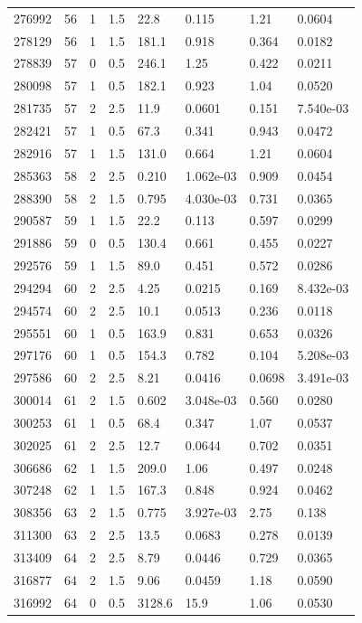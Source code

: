 \documentclass[preview]{standalone}
\begin{document}
{{{{{\begin{tabular}{L{1.2cm}C{1.2cm} C{0.3cm}C{0.5cm} C{1.4cm}C{1.4cm} C{1.4cm}C{1.4cm}}
  276992  &    56  & 1     & 1.5 &  22.8  & 0.115  & 1.21 &  0.0604   \\ 
  278129  &    56  & 1     & 1.5 &  181.1  & 0.918  & 0.364 &  0.0182   \\ 
  278839  &    57  & 0     & 0.5 &  246.1  & 1.25  & 0.422 &  0.0211   \\ 
  280098  &    57  & 1     & 0.5 &  182.1  & 0.923  & 1.04 &  0.0520   \\ 
  281735  &    57  & 2     & 2.5 &  11.9  & 0.0601  & 0.151 &  7.540e-03   \\ 
  282421  &    57  & 1     & 0.5 &  67.3  & 0.341  & 0.943 &  0.0472   \\ 
  282916  &    57  & 1     & 1.5 &  131.0  & 0.664  & 1.21 &  0.0604   \\ 
  285363  &    58  & 2     & 2.5 &  0.210  & 1.062e-03  & 0.909 &  0.0454   \\ 
  288390  &    58  & 2     & 1.5 &  0.795  & 4.030e-03  & 0.731 &  0.0365   \\ 
  290587  &    59  & 1     & 1.5 &  22.2  & 0.113  & 0.597 &  0.0299   \\ 
  291886  &    59  & 0     & 0.5 &  130.4  & 0.661  & 0.455 &  0.0227   \\ 
  292576  &    59  & 1     & 1.5 &  89.0  & 0.451  & 0.572 &  0.0286   \\ 
  294294  &    60  & 2     & 2.5 &  4.25  & 0.0215  & 0.169 &  8.432e-03   \\ 
  294574  &    60  & 2     & 2.5 &  10.1  & 0.0513  & 0.236 &  0.0118   \\ 
  295551  &    60  & 1     & 0.5 &  163.9  & 0.831  & 0.653 &  0.0326   \\ 
  297176  &    60  & 1     & 0.5 &  154.3  & 0.782  & 0.104 &  5.208e-03   \\ 
  297586  &    60  & 2     & 2.5 &  8.21  & 0.0416  & 0.0698 &  3.491e-03   \\ 
  300014  &    61  & 2     & 1.5 &  0.602  & 3.048e-03  & 0.560 &  0.0280   \\ 
  300253  &    61  & 1     & 0.5 &  68.4  & 0.347  & 1.07 &  0.0537   \\ 
  302025  &    61  & 2     & 2.5 &  12.7  & 0.0644  & 0.702 &  0.0351   \\ 
  306686  &    62  & 1     & 1.5 &  209.0  & 1.06  & 0.497 &  0.0248   \\ 
  307248  &    62  & 1     & 1.5 &  167.3  & 0.848  & 0.924 &  0.0462   \\ 
  308356  &    63  & 2     & 1.5 &  0.775  & 3.927e-03  & 2.75 &  0.138   \\ 
  311300  &    63  & 2     & 2.5 &  13.5  & 0.0683  & 0.278 &  0.0139   \\ 
  313409  &    64  & 2     & 2.5 &  8.79  & 0.0446  & 0.729 &  0.0365   \\ 
  316877  &    64  & 2     & 1.5 &  9.06  & 0.0459  & 1.18 &  0.0590   \\ 
  316992  &    64  & 0     & 0.5 &  3128.6  & 15.9  & 1.06 &  0.0530   \\ 
\hline 
\end{tabular} 

}}}}}
\end{document}

